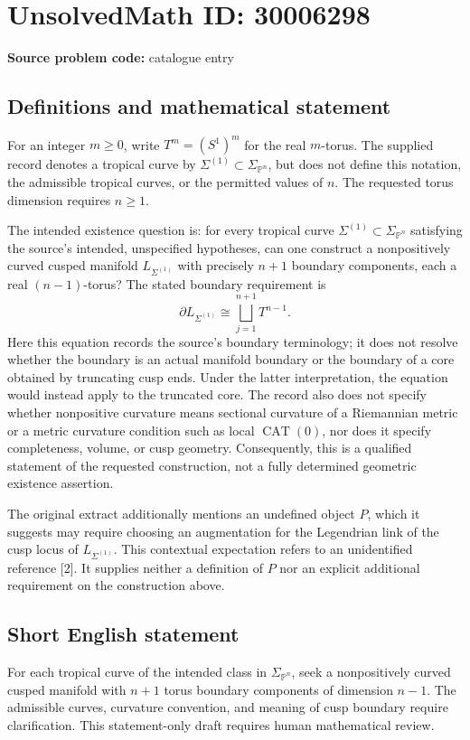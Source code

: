 \documentclass[11pt]{article}
\begin{document}
\section*{UnsolvedMath ID: 30006298}
\textbf{Source problem code:} catalogue entry
\subsection{Definitions and mathematical statement}
For an integer \(m\geq 0\), write \(T^m=(S^1)^m\) for the real \(m\)-torus. The supplied record denotes a tropical curve by \(\Sigma^{(1)}\subset\Sigma_{\mathbb{P}^n}\), but does not define this notation, the admissible tropical curves, or the permitted values of \(n\). The requested torus dimension requires \(n\geq 1\).

The intended existence question is: for every tropical curve \(\Sigma^{(1)}\subset\Sigma_{\mathbb{P}^n}\) satisfying the source's intended, unspecified hypotheses, can one construct a nonpositively curved cusped manifold \(L_{\Sigma^{(1)}}\) with precisely \(n+1\) boundary components, each a real \((n-1)\)-torus? The stated boundary requirement is
\[
\partial L_{\Sigma^{(1)}}\cong\bigsqcup_{j=1}^{n+1}T^{n-1}.
\]
Here this equation records the source's boundary terminology; it does not resolve whether the boundary is an actual manifold boundary or the boundary of a core obtained by truncating cusp ends. Under the latter interpretation, the equation would instead apply to the truncated core. The record also does not specify whether nonpositive curvature means sectional curvature of a Riemannian metric or a metric curvature condition such as local \(\operatorname{CAT}(0)\), nor does it specify completeness, volume, or cusp geometry. Consequently, this is a qualified statement of the requested construction, not a fully determined geometric existence assertion.

The original extract additionally mentions an undefined object \(P\), which it suggests may require choosing an augmentation for the Legendrian link of the cusp locus of \(L_{\Sigma^{(1)}}\). This contextual expectation refers to an unidentified reference [2]. It supplies neither a definition of \(P\) nor an explicit additional requirement on the construction above.
\subsection{Short English statement}
For each tropical curve of the intended class in \(\Sigma_{\mathbb{P}^n}\), seek a nonpositively curved cusped manifold with \(n+1\) torus boundary components of dimension \(n-1\). The admissible curves, curvature convention, and meaning of cusp boundary require clarification. This statement-only draft requires human mathematical review.
\end{document}
